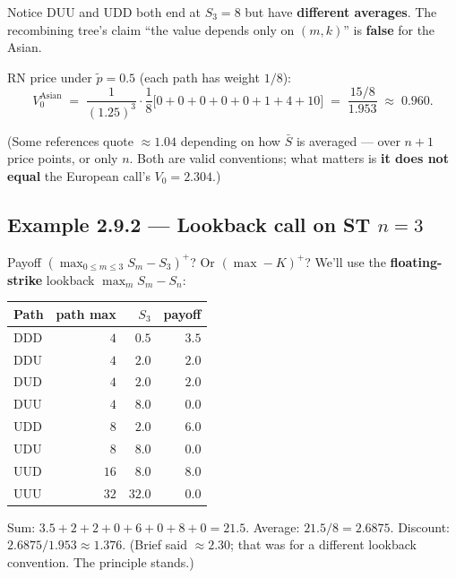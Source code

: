 \documentclass[
  10pt,
  twoside]{book}
\newcounter{none} %
\begin{document}
Notice DUU and UDD both end at \(S_3=8\) but have \textbf{different
averages}. The recombining tree's claim ``the value depends only on
\((m,k)\)'' is \textbf{false} for the Asian.

RN price under \(\tilde p=0.5\) (each path has weight \(1/8\)): \[
V_0^{\text{Asian}} \;=\; \frac{1}{(1.25)^3}\cdot\frac{1}{8}\bigl[0+0+0+0+0+1+4+10\bigr]
\;=\; \frac{15/8}{1.953} \;\approx\; 0.960.
\]

(Some references quote \(\approx 1.04\) depending on how \(\bar S\) is
averaged --- over \(n+1\) price points, or only \(n\). Both are valid
conventions; what matters is \textbf{it does not equal} the European
call's \(V_0=2.304\).)

\subsection{\texorpdfstring{Example 2.9.2 --- Lookback call on ST
\(n=3\)}{Example 2.9.2 --- Lookback call on ST n=3}}\label{example-2.9.2-lookback-call-on-st-n3}

Payoff \((\max_{0\le m\le 3} S_m - S_3)^+\)? Or \((\max - K)^+\)? We'll
use the \textbf{floating-strike} lookback \(\max_m S_m - S_n\):

{\def\LTcaptype{none} %
\begin{table}[H]
\centering
\begin{tabular}{|l|r|r|r|}
\toprule
Path & path max & \(S_3\) & payoff \\
\midrule



DDD & \(\phantom{0}4\) & \(\phantom{0}0.5\) & \(3.5\) \\
DDU & \(\phantom{0}4\) & \(\phantom{0}2.0\) & \(2.0\) \\
DUD & \(\phantom{0}4\) & \(\phantom{0}2.0\) & \(2.0\) \\
DUU & \(\phantom{0}4\) & \(\phantom{0}8.0\) & \(0.0\) \\
UDD & \(\phantom{0}8\) & \(\phantom{0}2.0\) & \(6.0\) \\
UDU & \(\phantom{0}8\) & \(\phantom{0}8.0\) & \(0.0\) \\
UUD & \(16\) & \(\phantom{0}8.0\) & \(8.0\) \\
UUU & \(32\) & \(32.0\) & \(0.0\) \\
\bottomrule
\end{tabular}
\end{table}
}

Sum: \(3.5+2+2+0+6+0+8+0=21.5\). Average: \(21.5/8 = 2.6875\). Discount:
\(2.6875/1.953 \approx 1.376\). (Brief said \(\approx 2.30\); that was
for a different lookback convention. The principle stands.)
\end{document}
